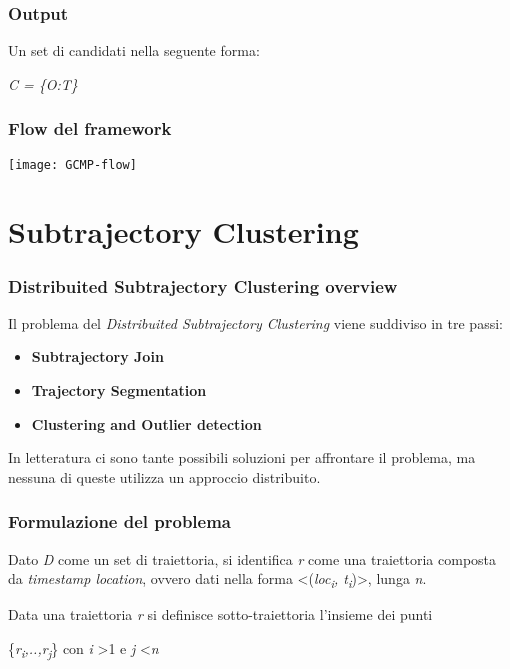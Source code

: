 \documentclass{beamer}
\begin{document}
\begin{frame}
	\frametitle{Output}
	Un set di candidati nella seguente forma: 
	
	\begin{center}
		\huge  \textit{C = \{O:T\}} 
	\end{center}




	
	
\end{frame}

\begin{frame}
	\frametitle{Flow del framework}

\texttt{[image: GCMP-flow]}
	
\end{frame}




\section{Subtrajectory Clustering}

\begin{frame}
	\frametitle{Distribuited Subtrajectory Clustering overview}
	
	Il problema del \textit{Distribuited Subtrajectory Clustering} viene suddiviso in tre passi:
	
	\begin{itemize}
		\item \textbf{Subtrajectory Join}
		\item \textbf{Trajectory Segmentation}
		\item \textbf{Clustering and Outlier detection}
	\end{itemize}

In letteratura ci sono tante possibili soluzioni per affrontare il problema, ma nessuna di queste utilizza un approccio distribuito.
\end{frame}

\begin{frame}
	\frametitle{Formulazione del problema}
	Dato \textit{D} come un set di traiettoria, si identifica \textit{r} come una traiettoria composta da \textit{timestamp location}, ovvero dati nella forma \textless (\textit{loc\textsubscript{i}, t\textsubscript{i}})\textgreater, lunga \textit{n}.
	
	Data una traiettoria \textit{r} si definisce sotto-traiettoria l'insieme dei punti 
	
	\{\textit{r\textsubscript{i},..,r\textsubscript{j}}\} con \textit{i} \textgreater 1 e \textit{j} \textless \textit{n}
\end{frame}
\end{document}
